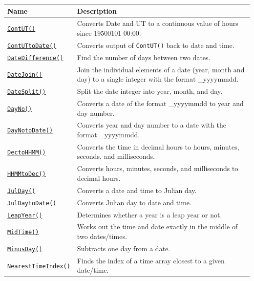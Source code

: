 	\begin{tabular}{|l|l|}
	\hline
	Name & Description \\
	\hline
	\href{include/datetime.h#L34}{\texttt{ContUT()}} & Converts Date and UT to a continuous value of hours since 19500101 00:00. \\
	\href{include/datetime.h#L51}{\texttt{ContUTtoDate()}} & Converts output of \texttt{ContUT()} back to date and time. \\
	\href{include/datetime.h#L69}{\texttt{DateDifference()}} & Find the number of days between two dates. \\
	\href{include/datetime.h#L87}{\texttt{DateJoin()}} & Join the individual elements of a date (year, month and day) to a single integer with the format \_yyyymmdd. \\
	\href{include/datetime.h#L105}{\texttt{DateSplit()}} & Split the date integer into year, month, and day. \\
	\href{include/datetime.h#L123}{\texttt{DayNo()}} & Converts a date of the format \_yyyymmdd to year and day number. \\
	\href{include/datetime.h#L140}{\texttt{DayNotoDate()}} & Converts year and day number to a date with the format \_yyyymmdd. \\
	\href{include/datetime.h#L159}{\texttt{DectoHHMM()}} & Converts the time in decimal hours to hours, minutes, seconds, and milliseconds. \\
	\href{include/datetime.h#L177}{\texttt{HHMMtoDec()}} & Converts hours, minutes, seconds, and milliseconds to decimal hours. \\
	\href{include/datetime.h#L193}{\texttt{JulDay()}} & Converts a date and time to Julian day. \\
	\href{include/datetime.h#L209}{\texttt{JulDaytoDate()}} & Converts Julian day to date and time. \\
	\href{include/datetime.h#L224}{\texttt{LeapYear()}} & Determines whether a year is a leap year or not. \\
	\href{include/datetime.h#L242}{\texttt{MidTime()}} & Works out the time and date exactly in the middle of two dates/times. \\
	\href{include/datetime.h#L257}{\texttt{MinusDay()}} & Subtracts one day from a date. \\
	\href{include/datetime.h#L277}{\texttt{NearestTimeIndex()}} & Finds the index of a time array closest to a given date/time. \\

\end{tabular}
